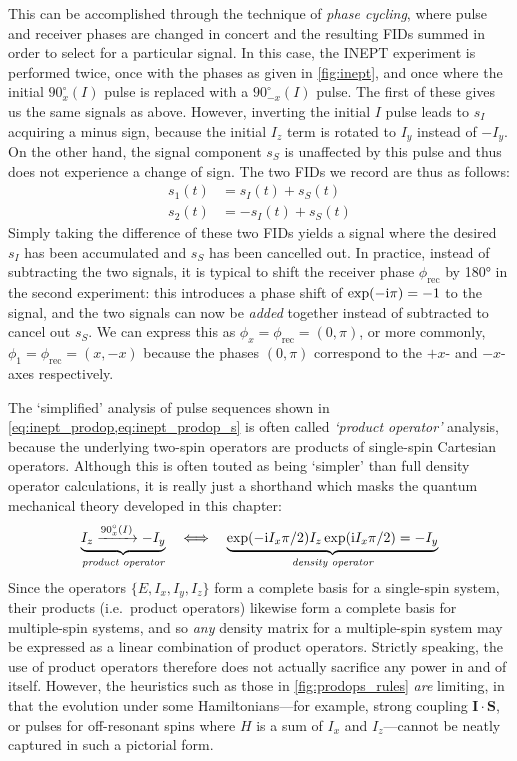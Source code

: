 This can be accomplished through the technique of \textit{phase cycling}, where pulse and receiver phases are changed in concert and the resulting FIDs summed in order to select for a particular signal.
In this case, the INEPT experiment is performed twice, once with the phases as given in \cref{fig:inept}, and once where the initial $90^\circ_x(I)$ pulse is replaced with a $90^\circ_{-x}(I)$ pulse.
The first of these gives us the same signals as above.
However, inverting the initial $I$ pulse leads to $s_I$ acquiring a minus sign, because the initial $I_z$ term is rotated to $I_y$ instead of $-I_y$.
On the other hand, the signal component $s_S$ is unaffected by this pulse and thus does not experience a change of sign.
The two FIDs we record are thus as follows:
\begin{align}
    \label{eq:inept_phase_cycling}
    s_1(t) &= s_I(t) + s_S(t) \\
    s_2(t) &= -s_I(t) + s_S(t)
\end{align}
Simply taking the difference of these two FIDs yields a signal where the desired $s_I$ has been accumulated and $s_S$ has been cancelled out.
In practice, instead of subtracting the two signals, it is typical to shift the receiver phase $\phi_\text{rec}$ by \ang{180} in the second experiment: this introduces a phase shift of $\exp(-\mathrm{i}\pi) = -1$ to the signal, and the two signals can now be \textit{added} together instead of subtracted to cancel out $s_S$.
We can express this as $\phi_x = \phi_\text{rec} = (0, \pi)$, or more commonly, $\phi_1 = \phi_\text{rec} = (x, -x)$ because the phases $(0, \pi)$ correspond to the $+x$- and $-x$-axes respectively.

The `simplified' analysis of pulse sequences shown in \cref{eq:inept_prodop,eq:inept_prodop_s} is often called \textit{`product operator'} analysis\autocite{Sorensen1984PNMRS}, because the underlying two-spin operators are products of single-spin Cartesian operators.
Although this is often touted as being `simpler' than full density operator calculations, it is really just a shorthand which masks the quantum mechanical theory developed in this chapter:
\begin{equation}
    \label{eq:product_operator_shorthand}
    \underbrace{I_z \xrightarrow{90^\circ_x(I)} -I_y}_{\textit{product operator}}
    \quad\Longleftrightarrow\quad
    \underbrace{\exp(-\mathrm{i} I_x\pi/2)I_z\exp(\mathrm{i} I_x\pi/2) = -I_y}_{\textit{density operator}}
\end{equation}
Since the operators $\{E, I_x, I_y, I_z\}$ form a complete basis for a single-spin system, their products (i.e.\ product operators) likewise form a complete basis for multiple-spin systems, and so \textit{any} density matrix for a multiple-spin system may be expressed as a linear combination of product operators.
Strictly speaking, the use of product operators therefore does not actually sacrifice any power in and of itself.
However, the heuristics such as those in \cref{fig:prodops_rules} \textit{are} limiting, in that the evolution under some Hamiltonians---for example, strong coupling $\symbf{I}\cdot\symbf{S}$, or pulses for off-resonant spins where $H$ is a sum of $I_x$ and $I_z$---cannot be neatly captured in such a pictorial form.
